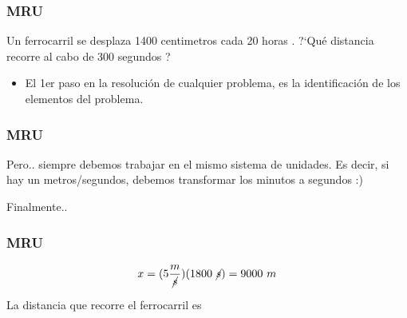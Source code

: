 \documentclass{beamer}
\begin{document}
\begin{frame}
\frametitle{MRU}

Un {{ ferrocarril }} {{ se desplaza }} {{ 1400 centimetros }} cada {{ 20 horas }}. ?`Qu\'e {{ distancia }} recorre al cabo de {{ 300 segundos ?}} %


\begin{itemize}
\item El 1er paso en la resoluci\'on de cualquier problema, es la
identificaci\'on de los elementos del problema.
\end{itemize}


\end{frame}

\begin{frame}
\frametitle{MRU}
{\huge \xmru}

Pero.. siempre debemos trabajar en el mismo sistema de unidades.
Es decir, si hay un metros/segundos,
debemos transformar los 
minutos a segundos :)

\begin{center}
\end{center}

Finalmente..
\end{frame}

\begin{frame}
\frametitle{MRU}
{\large
\begin{equation}
x=
(5\frac{m}{\cancel{s}})
(1800~\cancel{s})=
9000~m
\end{equation}}

La distancia que recorre el ferrocarril es
\end{frame}
\end{document}
